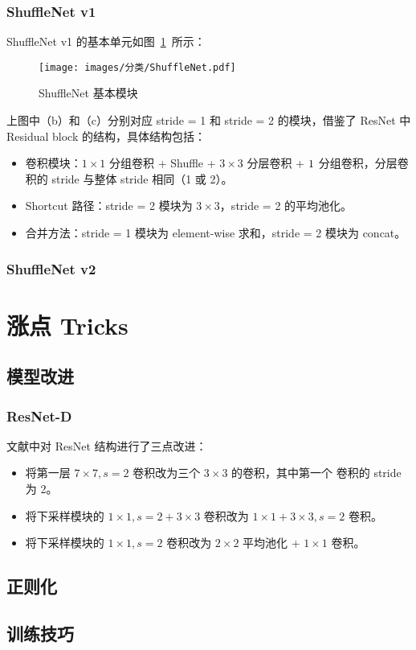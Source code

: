 \subsection{ShuffleNet v1}
ShuffleNet v1 的基本单元如图~\ref{fig:shufflenet}~所示：

\begin{figure}[ht]
  \centering
  \texttt{[image: images/分类/ShuffleNet.pdf]}
  \caption{ShuffleNet 基本模块}
  \label{fig:shufflenet}
\end{figure}

上图中（b）和（c）分别对应 stride = 1 和 stride = 2 的模块，借鉴了 ResNet 中
Residual block 的结构，具体结构包括：

\begin{itemize}
  \item 卷积模块：$1 \times 1$ 分组卷积 + Shuffle + $3 \times 3$ 分层卷积 + $1
    \time 1$ 分组卷积，分层卷积的 stride 与整体 stride 相同（1 或 2）。
  \item Shortcut 路径：stride = 2 模块为 $3 \times 3$，stride = 2 的平均池化。
  \item 合并方法：stride = 1 模块为 element-wise 求和，stride = 2 模块为 concat。
\end{itemize}

\subsection{ShuffleNet v2}

\chapter{涨点 Tricks}
\section{模型改进}
\subsection{ResNet-D}
文献中对 ResNet 结构进行了三点改进：
\begin{itemize}
  \item 将第一层 $7 \times 7, s=2$ 卷积改为三个 $3 \times 3$ 的卷积，其中第一个
    卷积的 stride 为 2。
  \item 将下采样模块的 $1 \times 1, s=2 + 3 \times 3$ 卷积改为 $1 \times 1 + 3
    \times 3, s=2$ 卷积。
  \item 将下采样模块的 $1 \times 1, s=2$ 卷积改为 $2 \times 2$ 平均池化 + $1
    \times 1$ 卷积。
\end{itemize}

\section{正则化}

\section{训练技巧}


